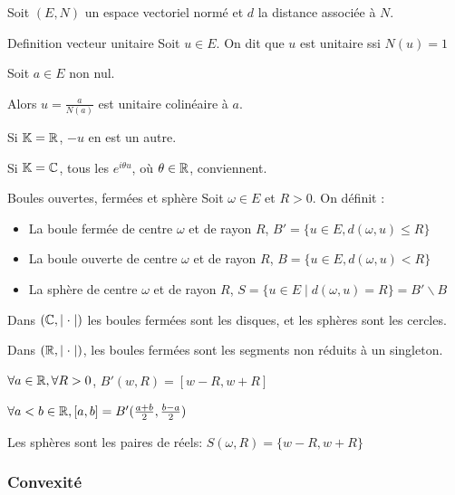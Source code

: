 Soit $(E, N)$ un espace vectoriel normé et $d$ la distance associée à $N$. 


\begin{definition}{Definition vecteur unitaire}{}
    Soit $u \in E$. On dit que $u$ est unitaire ssi $N(u) = 1$
\end{definition}

\begin{exemple}
    Soit $a \in E$ non nul. 

    Alors $u = \frac{a }{N(a)}$ est unitaire colinéaire à $a$. 

    Si $\mathbb{K} = \mathbb{R}$, $-u$ en est un autre. 

    Si $\mathbb{K} = \mathbb{C}$, tous les $e^{i \theta u}$, où $\theta \in \mathbb{R}$, conviennent. 
\end{exemple}

\begin{definition}{Boules ouvertes, fermées et sphère}{}
    Soit $\omega \in E$ et $R > 0$. On définit : 
    \begin{itemize}
        \item La boule fermée de centre $\omega$ et de rayon $R$, $B' = \{u \in E, d(\omega, u) \leqslant R\}$
        \item La boule ouverte de centre $\omega$ et de rayon $R$, $B = \{u \in E, d(\omega, u) < R\}$
        \item La sphère de centre $\omega$ et de rayon $R$, $S = \{u \in E \mid d(\omega, u) = R\} = B' \backslash B$
    \end{itemize}  
\end{definition}

\begin{exemple}
    Dans $(\mathbb{C}, \mid \cdot \mid)$ les boules fermées sont les disques, et les sphères sont les cercles. 

    Dans $(\mathbb{R}, \mid \cdot \mid)$, les boules fermées sont les segments non 
    réduits à un singleton.
    
    $\forall a \in \mathbb{R}, \forall R > 0$, $B'(w, R) = \left[w - R, w + R\right]$

    $\forall a < b \in \mathbb{R}, \left[a, b \right] = B'(\frac{a + b} 2, \frac{b - a} 2)$

    Les sphères sont les paires de réels: $S(\omega, R) = \{w - R, w + R\}$
\end{exemple}

\subsubsection{Convexité}

